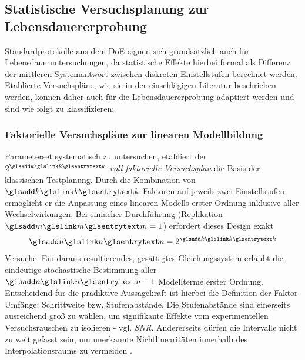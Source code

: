 \subsection{Statistische Versuchsplanung zur Lebensdauererprobung} \label{subsec:pläne}

Standardprotokolle aus dem \ac{DoE} eignen sich grundsätzlich auch für Lebensdaueruntersuchungen, da statistische Effekte hierbei formal als Differenz der mittleren Systemantwort zwischen diskreten Einstellstufen berechnet werden.
Etablierte Versuchspläne, wie sie in der einschlägigen Literatur \cite{Montgomery.2020,Siebertz.2026} beschrieben werden, können daher auch für die Lebensdauererprobung adaptiert werden und sind wie folgt zu klassifizieren:

\subsubsection{Faktorielle Versuchspläne zur linearen Modellbildung} \label{subsubsec:faktoriell}

 Parameterset systematisch zu un\-ter\-su\-chen, etabliert der \textit{$2^{\sym{k}}$ voll-fak\-to\-ri\-el\-le Ver\-suchs\-plan} die Basis der klassischen Testplanung.
Durch die Kombination von $\sym{k}$ Faktoren auf jeweils zwei Einstellstufen ermöglicht er die Anpassung eines linearen Modells erster Ordnung inklusive aller Wechselwirkungen.
Bei einfacher Durchführung (Replikation $\sym{m}=1$) erfordert dieses Design exakt
\begin{equation}
    \sym{n}=2^{\sym{k}}
    \label{eq:ffvp_n}
\end{equation}
Versuche.
Ein daraus resultierendes, gesättigtes Gleichungssystem erlaubt die eindeutige stochastische Bestimmung aller $\sym{n}-1$ Modellterme erster Ordnung.
Entscheidend für die prädiktive Aussagekraft ist hierbei die Definition der Faktor-Umfänge: Schrittweite bzw. Stufenabstände.
Die Stufenabstände sind einerseits ausreichend groß zu wählen, um signifikante Effekte vom experimentellen Versuchsrauschen zu isolieren - vgl. \textit{\ac{SNR}}.
Andererseits dürfen die Intervalle nicht zu weit gefasst sein, um unerkannte Nichtlinearitäten innerhalb des Interpolationsraums zu vermeiden \cite{Wu.2021,Siebertz.2026,Kleppmann.2020}.

